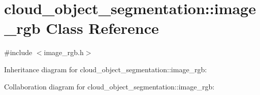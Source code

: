 \hypertarget{classcloud__object__segmentation_1_1image__rgb}{}\section{cloud\+\_\+object\+\_\+segmentation\+:\+:image\+\_\+rgb Class Reference}
\label{classcloud__object__segmentation_1_1image__rgb}


{\ttfamily \#include $<$image\+\_\+rgb.\+h$>$}



Inheritance diagram for cloud\+\_\+object\+\_\+segmentation\+:\+:image\+\_\+rgb\+:


Collaboration diagram for cloud\+\_\+object\+\_\+segmentation\+:\+:image\+\_\+rgb\+:
